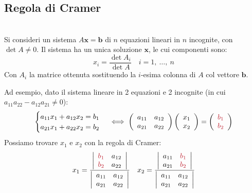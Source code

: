 \subsection{Regola di Cramer}\label{Cramerrimembriancor}
\begin{theorema}~{}\\
	Si consideri un sistema $A\mathbf{x}=\mathbf{b}$ di $n$ equazioni lineari in $n$ incognite, con $\det A \neq 0$. Il sistema ha un unica soluzione $\mathbf{x}$, le cui componenti sono:
	\begin{equation}
		x_i=\frac{\det A_i}{\det A}\quad i=1,\ \ldots,\ n
	\end{equation}
	Con $A_i$ la matrice ottenuta sostituendo la $i$-esima colonna di $A$ col vettore $\mathbf{b}$.
\end{theorema}
Ad esempio, dato il sistema lineare in 2 equazioni e 2 incognite (in cui $a_{11}a_{22}-a_{12}a_{21}\neq 0$):
\begin{equation*}
	\begin{cases}
		a_{11}x_1+a_{12}x_2=b_1\\
		a_{21}x_1+a_{22}x_2=b_2
	\end{cases}\iff
\left(\begin{array}{cc}
	a_{11} & a_{12} \\
	a_{21} & a_{22}
\end{array}\right)\left(\begin{array}{c}
x_1 \\
x_2
\end{array}\right)=\left(\begin{array}{c}
\textcolor{redill}{b_1} \\
\textcolor{redill}{b_2}
\end{array}\right)
\end{equation*}
Possiamo trovare $x_1$ e $x_2$ con la regola di Cramer:
\begin{equation*}
	x_1=\frac{\left|\begin{array}{cc}
			\textcolor{redill}{b_1} & a_{12} \\
			\textcolor{redill}{b_2} & a_{22}
		\end{array}\right|}{\left|\begin{array}{cc}
		a_{11} & a_{12} \\
		a_{21} & a_{22}
	\end{array}\right|}\quad x_2=\frac{\left|\begin{array}{cc}
	 a_{11} & \textcolor{redill}{b_1} \\
	 a_{21} & \textcolor{redill}{b_2}
\end{array}\right|}{\left|\begin{array}{cc}
a_{11} & a_{12} \\
a_{21} & a_{22}
\end{array}\right|}
\end{equation*}
